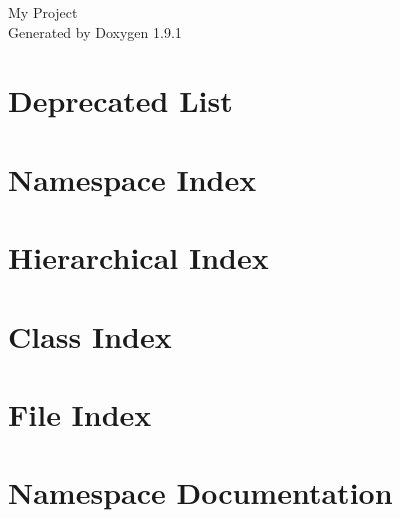 \let\mypdfximage\pdfximage\def\pdfximage{\immediate\mypdfximage}\documentclass[twoside]{book}
\newcommand{\+}{\discretionary{\mbox{\scriptsize$\hookleftarrow$}}{}{}}
\newcommand{\clearemptydoublepage}{%
    \newpage{\pagestyle{empty}\cleardoublepage}%
}
\begin{document}
    \raggedbottom

    \hypersetup{pageanchor=false,
        bookmarksnumbered=true,
        pdfencoding=unicode
    }
    \begin{titlepage}
        \vspace*{7cm}
        \begin{center}%
        {\Large My Project }
            \\
            \vspace*{1cm}
            {\large Generated by Doxygen 1.9.1}\\
        \end{center}
    \end{titlepage}
    \clearemptydoublepage
    \tableofcontents
    \clearemptydoublepage
    \hypersetup{pageanchor=true}



    \chapter{Deprecated List}
    \label{deprecated}
    


    \chapter{Namespace Index}
    


    \chapter{Hierarchical Index}
    


    \chapter{Class Index}
    


    \chapter{File Index}
    


    \chapter{Namespace Documentation}
    
\end{document}
